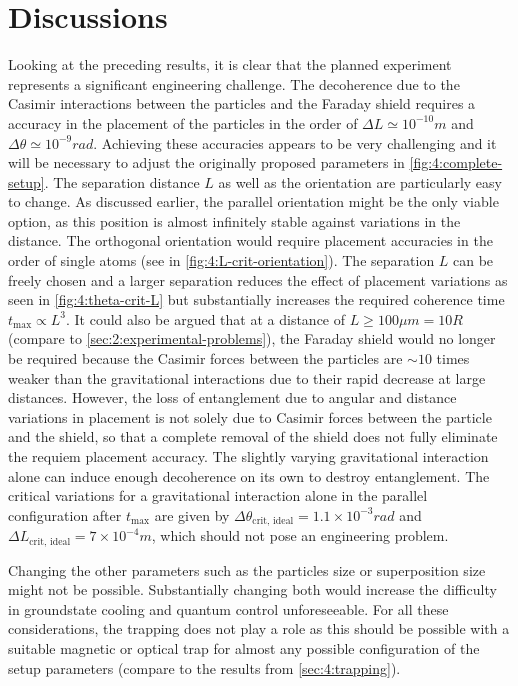 \section{Discussions}\label{sec:4:discussion}
Looking at the preceding results, it is clear that the planned experiment represents a significant engineering challenge. The decoherence due to the Casimir interactions between the particles and the Faraday shield requires a accuracy in the placement of the particles in the order of $\Delta L \simeq 10^{-10}\si{m}$ and $\Delta \theta \simeq 10^{-9}\si{rad}$.
Achieving these accuracies appears to be very challenging and it will be necessary to adjust the originally proposed parameters in \cref{fig:4:complete-setup}. The separation distance $L$ as well as the orientation are particularly easy to change.
As discussed earlier, the parallel orientation might be the only viable option, as this position is almost infinitely stable against variations in the distance. The orthogonal orientation would require placement accuracies in the order of single atoms (see in \cref{fig:4:L-crit-orientation}).
The separation $L$ can be freely chosen and a larger separation reduces the effect of placement variations as seen in \cref{fig:4:theta-crit-L} but substantially increases the required coherence time $t_\mathrm{max} \propto L^3$.
It could also be argued that at a distance of $L \geq 100\si{\mu m} = 10 R$ (compare to \cref{sec:2:experimental-problems}), the Faraday shield would no longer be required because the Casimir forces between the particles are $\sim 10$ times weaker than the gravitational interactions due to their rapid decrease at large distances.
However, the loss of entanglement due to angular and distance variations in placement is not solely due to Casimir forces between the particle and the shield, so that a complete removal of the shield does not fully eliminate the requiem placement accuracy.
The slightly varying gravitational interaction alone can induce enough decoherence on its own to destroy entanglement. 
The critical variations for a gravitational interaction alone in the parallel configuration after $t_\mathrm{max}$ are given by $\Delta \theta_\mathrm{crit,\,ideal} = 1.1 \times 10^{-3}\si{rad}$ and $\Delta L_\mathrm{crit,\,ideal} = 7\times 10^{-4}\si{m}$, which should not pose an engineering problem.

Changing the other parameters such as the particles size or superposition size might not be possible. Substantially changing both would increase the difficulty in groundstate cooling and quantum control unforeseeable.
For all these considerations, the trapping does not play a role as this should be possible with a suitable magnetic or optical trap for almost any possible configuration of the setup parameters (compare to the results from \cref{sec:4:trapping}).

